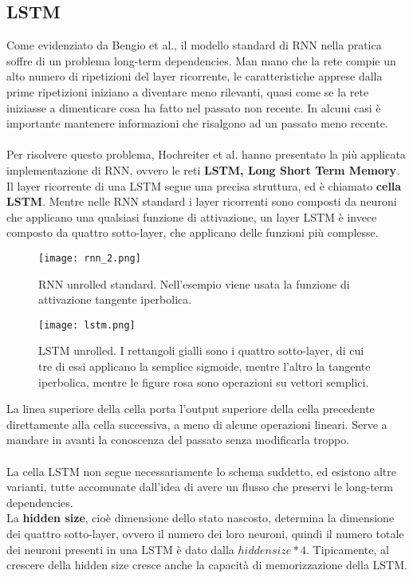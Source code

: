 \subsection{LSTM}
Come evidenziato da Bengio et al.\cite{long_term}, il modello standard di RNN nella pratica soffre di un problema long-term dependencies. Man mano che la rete compie un alto numero di ripetizioni del layer ricorrente, le caratteristiche apprese dalla prime ripetizioni iniziano a diventare meno rilevanti, quasi come se la rete iniziasse a dimenticare cosa ha fatto nel passato non recente. In alcuni casi è importante mantenere informazioni che risalgono ad un passato meno recente.\\
\\
Per risolvere questo problema, Hochreiter et al.\cite{lstm} hanno presentato la più applicata implementazione di RNN, ovvero le reti \textbf{LSTM, Long Short Term Memory}.\\
Il layer ricorrente di una LSTM segue una precisa struttura, ed è chiamato \textbf{cella LSTM}. Mentre nelle RNN standard i layer ricorrenti sono composti da neuroni che applicano una qualsiasi funzione di attivazione, un layer LSTM è invece composto da quattro sotto-layer, che applicano delle funzioni più complesse.
\begin{figure}[H]
	\centering
	\texttt{[image: rnn\_2.png]}
	\caption{RNN unrolled standard. Nell'esempio viene usata la funzione di attivazione tangente iperbolica.}
	\label{fig:rnn_2}
\end{figure}
\begin{figure}[H]
	\centering
	\texttt{[image: lstm.png]}
	\caption{LSTM unrolled. I rettangoli gialli sono i quattro sotto-layer, di cui tre di essi applicano la semplice sigmoide, mentre l'altro la tangente iperbolica, mentre le figure rosa sono operazioni su vettori semplici.}
	\label{fig:lstm}
\end{figure}
La linea superiore della cella porta l'output superiore della cella precedente direttamente alla cella successiva, a meno di alcune operazioni lineari. Serve a mandare in avanti la conoscenza del passato senza modificarla troppo.\\
\\
La cella LSTM non segue necessariamente lo schema suddetto, ed esistono altre varianti, tutte accomunate dall'idea di avere un flusso che preservi le long-term dependencies.\\
La \textbf{hidden size}, cioè dimensione dello stato nascosto, determina la dimensione dei quattro sotto-layer, ovvero il numero dei loro neuroni, quindi il numero totale dei neuroni presenti in una LSTM è dato dalla $hidden size * 4$. Tipicamente, al crescere della hidden size cresce anche la capacità di memorizzazione della LSTM.

